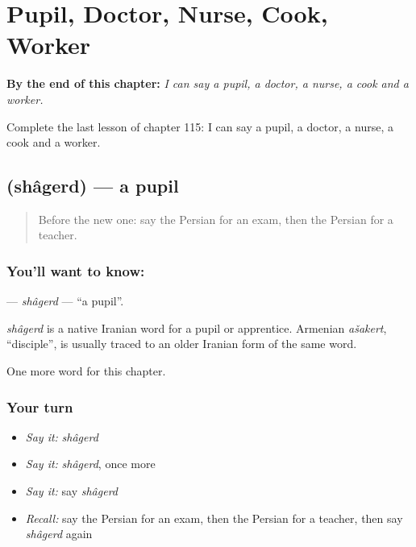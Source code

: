 
\chapter{Pupil, Doctor, Nurse, Cook, Worker}
\label{ch:fa-pupil-doctor-nurse-cook-worker}

\begin{chapteropening}
\textbf{By the end of this chapter:} \emph{I can say a pupil, a doctor, a nurse, a cook and a worker.}

Complete the last lesson of chapter 115: I can say a pupil, a doctor, a nurse, a cook and a worker.
\end{chapteropening}

\section[\texorpdfstring{\fa{شاگرد} (shâgerd)}{شاگرد (shâgerd)}]{ (shâgerd) — a pupil}

\label{lesson:FA-C115-shagerd}



\begin{quote}
Before the new one: say the Persian for an exam, then the Persian for a teacher.
\end{quote}

\subsection*{You'll want to know: }
\textbf{} — \emph{shâgerd} — \textquotedblleft{}a pupil\textquotedblright{}.

\begin{cousinweb}
\emph{shâgerd} is a native Iranian word for a pupil or apprentice. Armenian \emph{ašakert}, \textquotedblleft{}disciple\textquotedblright{}, is usually traced to an older Iranian form of the same word.
\end{cousinweb}

\begin{grammarlens}[title={What you've built}]
One more word for this chapter.
\end{grammarlens}

\subsection*{Your turn}
\begin{itemize}
\raggedright
  \item \emph{Say it:} \emph{shâgerd}
  \item \emph{Say it:} \emph{shâgerd}, once more
  \item \emph{Say it:} say \emph{shâgerd}
  \item \emph{Recall:} say the Persian for an exam, then the Persian for a teacher, then say \emph{shâgerd} again
\end{itemize}

